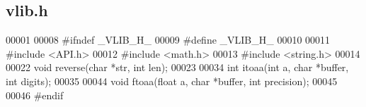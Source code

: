 \subsection{vlib.\+h}
\label{vlib_8h_source}

\begin{DoxyCode}
00001 
00008 \textcolor{preprocessor}{#ifndef \_VLIB\_H\_}
00009 \textcolor{preprocessor}{#define \_VLIB\_H\_}
00010 
00011 \textcolor{preprocessor}{#include <API.h>}
00012 \textcolor{preprocessor}{#include <math.h>}
00013 \textcolor{preprocessor}{#include <string.h>}
00014 
00022 \textcolor{keywordtype}{void} reverse(\textcolor{keywordtype}{char} *str, \textcolor{keywordtype}{int} len);
00023 
00034 \textcolor{keywordtype}{int} itoaa(\textcolor{keywordtype}{int} a, \textcolor{keywordtype}{char} *buffer, \textcolor{keywordtype}{int} digits);
00035 
00044 \textcolor{keywordtype}{void} ftoaa(\textcolor{keywordtype}{float} a, \textcolor{keywordtype}{char} *buffer, \textcolor{keywordtype}{int} precision);
00045 
00046 \textcolor{preprocessor}{#endif}
\end{DoxyCode}
